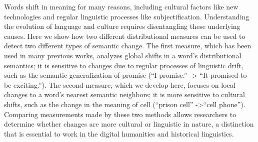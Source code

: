 Words shift in meaning for many reasons, including cultural factors like new technologies and regular linguistic processes like subjectification. Understanding the evolution of language and culture requires disentangling these underlying causes. Here we show how two different distributional measures can be used to detect two different types of semantic change. The first measure, which has been used in many previous works, analyzes global shifts in a word's distributional semantics; it is sensitive to changes due to regular processes of linguistic drift, such as the semantic generalization of promise (``I promise.'' -> ``It promised to be exciting.''). The second measure, which we develop here, focuses on local changes to a word's nearest semantic neighbors; it is more sensitive to cultural shifts, such as the change in the meaning of cell (``prison cell'' ->``cell phone''). Comparing measurements made by these two methods allows researchers to determine whether changes are more cultural or linguistic in nature, a distinction that is essential to work in the digital humanities and historical linguistics.
